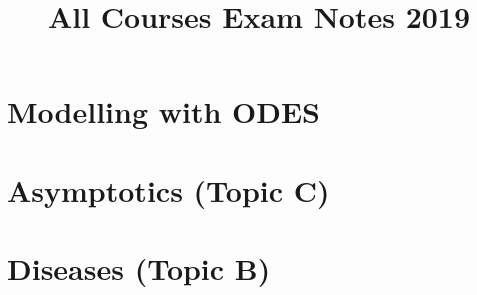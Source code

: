 \documentclass{X:/Documents/Coding/Latex/myassignment}
\title{All Courses Exam Notes 2019}
\begin{document}
	
\section{Modelling with ODES}
\section{Asymptotics (Topic C)}
\section{Diseases (Topic B)}
\end{document}
